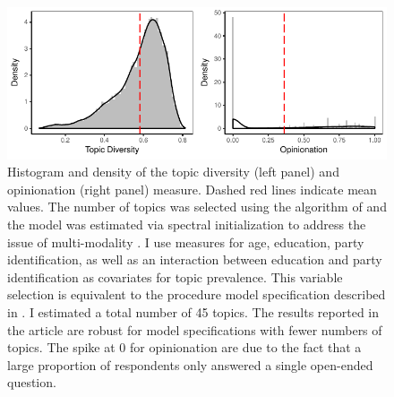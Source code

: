 \documentclass[12pt]{article}
\begin{document}
\begin{figure}[h]\centering
\includegraphics{../fig/swiss_diversity.pdf}
\caption{Histogram and density of the topic diversity (left panel) and opinionation (right panel) measure. Dashed red lines indicate mean values. The number of topics was selected using the algorithm of \citet{lee2014low} and the model was estimated via spectral initialization to address the issue of multi-modality \citep[see][for details]{roberts2014stm}. I use measures for age, education, party identification, as well as an interaction between education and party identification as covariates for topic prevalence. This variable selection is equivalent to the procedure model specification described in \citet{roberts2014structural}. I estimated a total number of 45 topics. The results reported in the article are robust for model specifications with fewer numbers of topics. The spike at 0 for opinionation are due to the fact that a large proportion of respondents only answered a single open-ended question.}\label{fig:swiss_diversity}
\end{figure}
\end{document}
